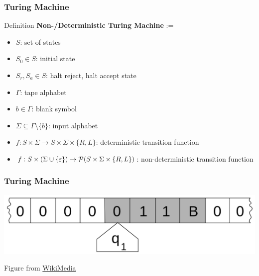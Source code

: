 \documentclass[languages_and_machines.tex]{subfiles}
\begin{document}
\begin{frame}
  \frametitle{Turing Machine}

  \begin{block}{Definition}
    \textbf{Non-/Deterministic Turing Machine} := \begin{itemize}
    \item \(S\): set of states
    \item \(S_0 \in S\): initial state
    \item \(S_r, S_a \in S\): halt reject, halt accept state
    \item \(\Gamma\): tape alphabet
    \item \(b \in \Gamma\): blank symbol
    \item \(\Sigma \subseteq \Gamma \setminus \{b\}\): input alphabet
    \item \(f: S \times \Sigma \to S \times \Sigma \times \{R, L\}\): deterministic transition function
    \item \(f: S \times (\Sigma \cup \{\varepsilon\}) \to \mathcal P(S \times \Sigma \times \{R, L\})\): non-deterministic transition function
    \end{itemize}
  \end{block}
\end{frame}

\begin{frame}
  \frametitle{Turing Machine}

  \includegraphics[width=1.0\textwidth]{turing_machine_1.png}

  {\tiny
    Figure from \href{https://commons.wikimedia.org/wiki/File:Turing_machine_2b.svg}{WikiMedia}
  }


\end{frame}
\end{document}
